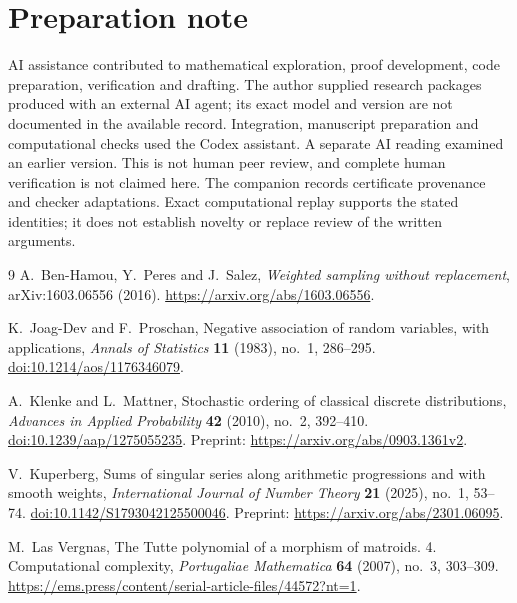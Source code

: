 \documentclass[11pt,a4paper]{article}
\theoremstyle{remark}
\numberwithin{equation}{section}
\begin{document}
\section*{Preparation note}
AI assistance contributed to mathematical exploration, proof development,
code preparation, verification and drafting. The author supplied research
packages produced with an external AI agent; its exact model and version
are not documented in the available record. Integration, manuscript
preparation and computational checks used the Codex assistant.
A separate AI reading examined an earlier version. This is not human
peer review, and complete human verification is not claimed here.
The companion records certificate provenance and checker adaptations.
Exact computational replay supports the stated identities; it does not
establish novelty or replace review of the written arguments.

\begin{thebibliography}{9}
A.~Ben-Hamou, Y.~Peres and J.~Salez,
\emph{Weighted sampling without replacement},
arXiv:1603.06556 (2016).
\url{https://arxiv.org/abs/1603.06556}.

K.~Joag-Dev and F.~Proschan,
Negative association of random variables, with applications,
\emph{Annals of Statistics} \textbf{11} (1983), no.~1, 286--295.
\href{https://doi.org/10.1214/aos/1176346079}{doi:10.1214/aos/1176346079}.

A.~Klenke and L.~Mattner,
Stochastic ordering of classical discrete distributions,
\emph{Advances in Applied Probability} \textbf{42} (2010), no.~2, 392--410.
\href{https://doi.org/10.1239/aap/1275055235}{doi:10.1239/aap/1275055235}.
Preprint:
\url{https://arxiv.org/abs/0903.1361v2}.

V.~Kuperberg,
Sums of singular series along arithmetic progressions and with
smooth weights,
\emph{International Journal of Number Theory} \textbf{21} (2025), no.~1, 53--74.
\href{https://doi.org/10.1142/S1793042125500046}{doi:10.1142/S1793042125500046}.
Preprint:
\url{https://arxiv.org/abs/2301.06095}.

M.~Las Vergnas,
The Tutte polynomial of a morphism of matroids.
4. Computational complexity,
\emph{Portugaliae Mathematica} \textbf{64} (2007), no.~3, 303--309.
\url{https://ems.press/content/serial-article-files/44572?nt=1}.
\end{thebibliography}
\end{document}
